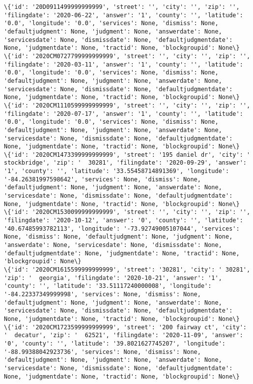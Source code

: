 \documentclass[11pt]{article}
\begin{document}
\begin{Verbatim}[commandchars=\\\{\}]
\{'id': '20D0911499999999999', 'street': '', 'city': '', 'zip': '', 'filingdate': '2020-06-22', 'answer': '1', 'county': '', 'latitude': '0.0', 'longitude': '0.0', 'services': None, 'dismiss': None, 'defaultjudgment': None, 'judgment': None, 'answerdate': None, 'servicesdate': None, 'dismissdate': None, 'defaultjudgmentdate': None, 'judgmentdate': None, 'tractid': None, 'blockgroupid': None\}
\{'id': '2020CM0727799999999999', 'street': '', 'city': '', 'zip': '', 'filingdate': '2020-03-11', 'answer': '1', 'county': '', 'latitude': '0.0', 'longitude': '0.0', 'services': None, 'dismiss': None, 'defaultjudgment': None, 'judgment': None, 'answerdate': None, 'servicesdate': None, 'dismissdate': None, 'defaultjudgmentdate': None, 'judgmentdate': None, 'tractid': None, 'blockgroupid': None\}
\{'id': '2020CM1110599999999999', 'street': '', 'city': '', 'zip': '', 'filingdate': '2020-07-17', 'answer': '1', 'county': '', 'latitude': '0.0', 'longitude': '0.0', 'services': None, 'dismiss': None, 'defaultjudgment': None, 'judgment': None, 'answerdate': None, 'servicesdate': None, 'dismissdate': None, 'defaultjudgmentdate': None, 'judgmentdate': None, 'tractid': None, 'blockgroupid': None\}
\{'id': '2020CM1473399999999999', 'street': '195 daniel dr', 'city': '  stockbridge', 'zip': '  30281', 'filingdate': '2020-09-29', 'answer': '1', 'county': '', 'latitude': '33.55458714891369', 'longitude': '-84.26381997598642', 'services': None, 'dismiss': None, 'defaultjudgment': None, 'judgment': None, 'answerdate': None, 'servicesdate': None, 'dismissdate': None, 'defaultjudgmentdate': None, 'judgmentdate': None, 'tractid': None, 'blockgroupid': None\}
\{'id': '2020CM1530099999999999', 'street': '', 'city': '', 'zip': '', 'filingdate': '2020-10-12', 'answer': '0', 'county': '', 'latitude': '40.67485993782113', 'longitude': '-73.92749005107044', 'services': None, 'dismiss': None, 'defaultjudgment': None, 'judgment': None, 'answerdate': None, 'servicesdate': None, 'dismissdate': None, 'defaultjudgmentdate': None, 'judgmentdate': None, 'tractid': None, 'blockgroupid': None\}
\{'id': '2020CM1615599999999999', 'street': '30281', 'city': ' 30281', 'zip': '  georgia', 'filingdate': '2020-10-21', 'answer': '1', 'county': '', 'latitude': '33.51117240000008', 'longitude': '-84.22337349999998', 'services': None, 'dismiss': None, 'defaultjudgment': None, 'judgment': None, 'answerdate': None, 'servicesdate': None, 'dismissdate': None, 'defaultjudgmentdate': None, 'judgmentdate': None, 'tractid': None, 'blockgroupid': None\}
\{'id': '2020CM1723599999999999', 'street': '200 fairway ct', 'city': '  decatur', 'zip': '  62521', 'filingdate': '2020-11-09', 'answer': '0', 'county': '', 'latitude': '39.8021627745207', 'longitude': '-88.99388042923736', 'services': None, 'dismiss': None, 'defaultjudgment': None, 'judgment': None, 'answerdate': None, 'servicesdate': None, 'dismissdate': None, 'defaultjudgmentdate': None, 'judgmentdate': None, 'tractid': None, 'blockgroupid': None\}

\end{Verbatim}
\end{document}
